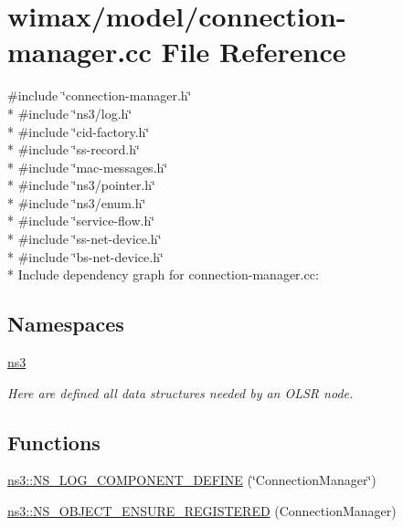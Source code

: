 \hypertarget{connection-manager_8cc}{}\section{wimax/model/connection-\/manager.cc File Reference}
\label{connection-manager_8cc}
{\ttfamily \#include \char`\"{}connection-\/manager.\+h\char`\"{}}\\*
{\ttfamily \#include \char`\"{}ns3/log.\+h\char`\"{}}\\*
{\ttfamily \#include \char`\"{}cid-\/factory.\+h\char`\"{}}\\*
{\ttfamily \#include \char`\"{}ss-\/record.\+h\char`\"{}}\\*
{\ttfamily \#include \char`\"{}mac-\/messages.\+h\char`\"{}}\\*
{\ttfamily \#include \char`\"{}ns3/pointer.\+h\char`\"{}}\\*
{\ttfamily \#include \char`\"{}ns3/enum.\+h\char`\"{}}\\*
{\ttfamily \#include \char`\"{}service-\/flow.\+h\char`\"{}}\\*
{\ttfamily \#include \char`\"{}ss-\/net-\/device.\+h\char`\"{}}\\*
{\ttfamily \#include \char`\"{}bs-\/net-\/device.\+h\char`\"{}}\\*
Include dependency graph for connection-\/manager.cc\+:
\subsection*{Namespaces}
\begin{DoxyCompactItemize}
\item 
 \hyperlink{namespacens3}{ns3}
\begin{DoxyCompactList}\small\item\em Here are defined all data structures needed by an O\+L\+SR node. \end{DoxyCompactList}\end{DoxyCompactItemize}
\subsection*{Functions}
\begin{DoxyCompactItemize}
\item 
\hyperlink{namespacens3_a8b288f9a7599c7e4d091eed9257bb3f6}{ns3\+::\+N\+S\+\_\+\+L\+O\+G\+\_\+\+C\+O\+M\+P\+O\+N\+E\+N\+T\+\_\+\+D\+E\+F\+I\+NE} (\char`\"{}Connection\+Manager\char`\"{})
\item 
\hyperlink{namespacens3_a15a8bbc9ed186bceaf2ea10f5d2eca3f}{ns3\+::\+N\+S\+\_\+\+O\+B\+J\+E\+C\+T\+\_\+\+E\+N\+S\+U\+R\+E\+\_\+\+R\+E\+G\+I\+S\+T\+E\+R\+ED} (Connection\+Manager)
\end{DoxyCompactItemize}
